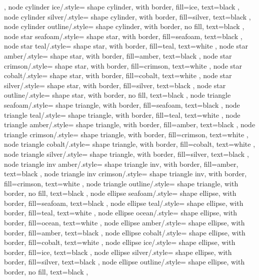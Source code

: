 {{	},
	node cylinder ice/.style={
		shape cylinder, with border,
		fill=ice, text=black
	},
	node cylinder silver/.style={
		shape cylinder, with border,
		fill=silver, text=black
	},
	node cylinder outline/.style={
		shape cylinder, with border,
		no fill, text=black
	},
	node star seafoam/.style={
		shape star, with border,
		fill=seafoam, text=black
	},
	node star teal/.style={
		shape star, with border,
		fill=teal, text=white
	},
	node star amber/.style={
		shape star, with border,
		fill=amber, text=black
	},
	node star crimson/.style={
		shape star, with border,
		fill=crimson, text=white
	},
	node star cobalt/.style={
		shape star, with border,
		fill=cobalt, text=white
	},
	node star silver/.style={
		shape star, with border,
		fill=silver, text=black
	},
	node star outline/.style={
		shape star, with border,
		no fill, text=black
	},
	node triangle seafoam/.style={
		shape triangle, with border,
		fill=seafoam, text=black
	},
	node triangle teal/.style={
		shape triangle, with border,
		fill=teal, text=white
	},
	node triangle amber/.style={
		shape triangle, with border,
		fill=amber, text=black
	},
	node triangle crimson/.style={
		shape triangle, with border,
		fill=crimson, text=white
	},
	node triangle cobalt/.style={
		shape triangle, with border,
		fill=cobalt, text=white
	},
	node triangle silver/.style={
		shape triangle, with border,
		fill=silver, text=black
	},
	node triangle inv amber/.style={
		shape triangle inv, with border,
		fill=amber, text=black
	},
	node triangle inv crimson/.style={
		shape triangle inv, with border,
		fill=crimson, text=white
	},
	node triangle outline/.style={
		shape triangle, with border,
		no fill, text=black
	},
	node ellipse seafoam/.style={
		shape ellipse, with border,
		fill=seafoam, text=black
	},
	node ellipse teal/.style={
		shape ellipse, with border,
		fill=teal, text=white
	},
	node ellipse ocean/.style={
		shape ellipse, with border,
		fill=ocean, text=white
	},
	node ellipse amber/.style={
		shape ellipse, with border,
		fill=amber, text=black
	},
	node ellipse cobalt/.style={
		shape ellipse, with border,
		fill=cobalt, text=white
	},
	node ellipse ice/.style={
		shape ellipse, with border,
		fill=ice, text=black
	},
	node ellipse silver/.style={
		shape ellipse, with border,
		fill=silver, text=black
	},
	node ellipse outline/.style={
		shape ellipse, with border,
		no fill, text=black
	},
}
